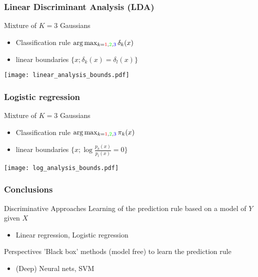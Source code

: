 \documentclass[compress, smaller, serif, 9pt]{beamer}
\newcommand{\structuretext}[1]{{\usebeamercolor[fg]{structure} #1}}
\newcommand{\doigt}{\structuretext{\noindent \Pisymbol{pzd}{43}}}
\begin{document}
\begin{frame}
  \frametitle{Linear Discriminant Analysis (LDA)}
\begin{block}{Mixture of $K=3$ Gaussians}
\begin{itemize}
   \item  Classification rule $\arg \max_{k=\textcolor{red}{1},\textcolor{green}{2},\textcolor{blue}{3}}
\delta_k(x)$
\item linear boundaries  $\{ x ; \delta_k(x)=\delta_l(x) \} $
\end{itemize}
\end{block}
\vspace*{-4mm}

\begin{center}
  \texttt{[image: linear\_analysis\_bounds.pdf]} \\
\end{center}

\end{frame}

\begin{frame}
  \frametitle{Logistic regression}
\begin{block}{Mixture of $K=3$ Gaussians}
\begin{itemize}
   \item   Classification rule $\arg \max_{k=\textcolor{red}{1},\textcolor{green}{2},\textcolor{blue}{3}}
\pi_k(x)$
\item linear boundaries  $\{ x ; \log{ \frac{p_k(x)}{p_l(x)} } = 0 \} $
\end{itemize}
\end{block}
\vspace*{-4mm}

\begin{center}
  \texttt{[image: log\_analysis\_bounds.pdf]} \\
\end{center}

\end{frame}

\begin{frame}
  \frametitle{Conclusions}
  \begin{block}{Discriminative Approaches}
   Learning  of the prediction rule based on a model of $Y$ given $X$
   \begin{itemize}
    \item[\doigt] Linear regression, Logistic regression
   \end{itemize}
  \end{block}
  
  \begin{block}{Perspectives}
  'Black box' methods (model free) to learn the  prediction rule 
   \begin{itemize}
    \item[\doigt] (Deep) Neural nets, SVM
   \end{itemize}

  \end{block}

\end{frame}
\end{document}
